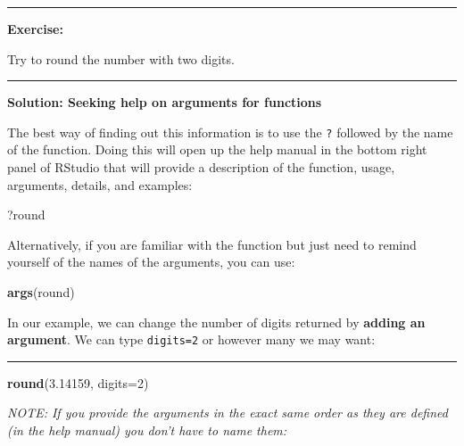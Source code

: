 \documentclass[
]{article}
\newenvironment{Shaded}{\begin{snugshade}}{\end{snugshade}}
\newcommand{\DataTypeTok}[1]{\textcolor[rgb]{0.13,0.29,0.53}{#1}}
\newcommand{\DecValTok}[1]{\textcolor[rgb]{0.00,0.00,0.81}{#1}}
\newcommand{\FloatTok}[1]{\textcolor[rgb]{0.00,0.00,0.81}{#1}}
\newcommand{\KeywordTok}[1]{\textcolor[rgb]{0.13,0.29,0.53}{\textbf{#1}}}
\newcommand{\NormalTok}[1]{#1}
\begin{document}
\begin{center}\rule{0.5\linewidth}{0.5pt}\end{center}

\textbf{Exercise:}

Try to round the number with two digits.

\begin{center}\rule{0.5\linewidth}{0.5pt}\end{center}

\textbf{Solution: Seeking help on arguments for functions}

The best way of finding out this information is to use the \texttt{?}
followed by the name of the function. Doing this will open up the help
manual in the bottom right panel of RStudio that will provide a
description of the function, usage, arguments, details, and examples:

\begin{Shaded}
\begin{Highlighting}[]
\NormalTok{?round}
\end{Highlighting}
\end{Shaded}

Alternatively, if you are familiar with the function but just need to
remind yourself of the names of the arguments, you can use:

\begin{Shaded}
\begin{Highlighting}[]
\KeywordTok{args}\NormalTok{(round)}
\end{Highlighting}
\end{Shaded}

In our example, we can change the number of digits returned by
\textbf{adding an argument}. We can type \texttt{digits=2} or however
many we may want:

\begin{center}\rule{0.5\linewidth}{0.5pt}\end{center}

\begin{Shaded}
\begin{Highlighting}[]
\KeywordTok{round}\NormalTok{(}\FloatTok{3.14159}\NormalTok{, }\DataTypeTok{digits=}\DecValTok{2}\NormalTok{)}
\end{Highlighting}
\end{Shaded}

\emph{NOTE: If you provide the arguments in the exact same order as they
are defined (in the help manual) you don't have to name them:}
\end{document}
